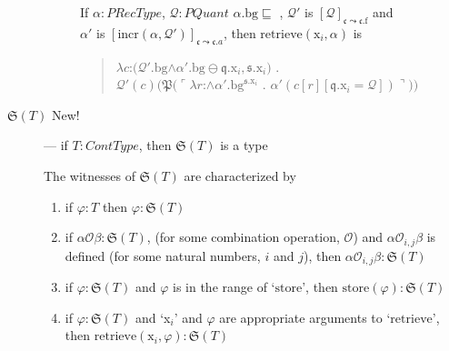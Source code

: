 \begin{description}
\begin{description}
    If $\alpha:\textit{PRecType}$, $\mathcal{Q}:\textit{PQuant}$ 
  $\alpha.\text{bg}\sqsubseteq$ , $\mathcal{Q}'$ is
$[\mathcal{Q}]_{\mathfrak{c}\leadsto\mathfrak{c}.\text{f}}$ and\\
$\alpha'$ is
$[\mathrm{incr}(\alpha,\mathcal{Q}')]_{\mathfrak{c}\leadsto\mathfrak{c}.a}$, then
  $\mathrm{retrieve}(\text{x}_i,\alpha)$ is
  \begin{quote}
    $\lambda
    c$:$(\mathcal{Q}'.\text{bg}$\d{$\wedge$}$\alpha'.\text{bg}\ominus\mathfrak{q}.\text{x}_i,\mathfrak{s}.\text{x}_i)$
    . \\ \hspace*{2em}$\mathcal{Q'}(c)(\mathfrak{P}(\ulcorner\lambda
    r$:\d{$\wedge$}$\alpha'.\text{bg}^{\mathfrak{s}.\text{x}_i}$
    . $\alpha'(c[r][\mathfrak{q}.\text{x}_i=\mathcal{Q}])\urcorner))$
  \end{quote}



\end{description}

\item[\textnormal{$\mathfrak{S}(T)$} New!] --- if
  $T:\textit{ContType}$, then $\mathfrak{S}(T)$ is a type

  The witnesses of $\mathfrak{S}(T)$ are characterized by
  \begin{enumerate} 
 
  \item if $\varphi:T$ then $\varphi:\mathfrak{S}(T)$ 

  \item if $\alpha\mathcal{O}\beta:\mathfrak{S}(T)$, (for
      some combination operation, $\mathcal{O}$) and
      $\alpha\mathcal{O}_{i,j}\beta$ is defined (for some natural
      numbers, $i$ and $j$), then $\alpha\mathcal{O}_{i,j}\beta:\mathfrak{S}(T)$
 
  \item if $\varphi:\mathfrak{S}(T)$ and $\varphi$ is in the range of `$\mathrm{store}$', then
    $\mathrm{store}(\varphi):\mathfrak{S}(T)$

  \item if $\varphi:\mathfrak{S}(T)$ and `x$_i$' and $\varphi$ are appropriate
    arguments to `$\mathrm{retrieve}$', then
    $\mathrm{retrieve}(\text{x}_i,\varphi):\mathfrak{S}(T)$
    

\end{enumerate}
\end{description}
